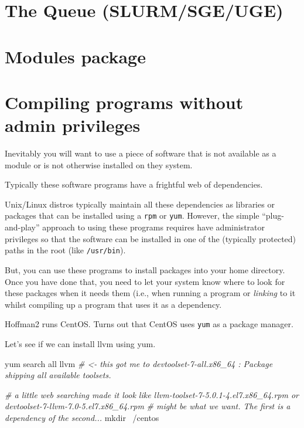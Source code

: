 \documentclass[]{krantz}
\makeatletter
\newenvironment{Shaded}{\begin{snugshade}}{\end{snugshade}}
\newcommand{\CommentTok}[1]{\textcolor[rgb]{0.37,0.37,0.37}{\textit{#1}}}
\newcommand{\ExtensionTok}[1]{#1}
\newcommand{\FunctionTok}[1]{\textcolor[rgb]{0,0,0}{#1}}
\newcommand{\NormalTok}[1]{#1}
\newenvironment{kframe}{%
\medskip{}
\setlength{\fboxsep}{.8em}
 \def\at@end@of@kframe{}%
 \ifinner\ifhmode%
  \def\at@end@of@kframe{\end{minipage}}%
  \begin{minipage}{\columnwidth}%
 \fi\fi%
 \def\FrameCommand##1{\hskip\@totalleftmargin \hskip-\fboxsep
 \colorbox{shadecolor}{##1}\hskip-\fboxsep
     \hskip-\linewidth \hskip-\@totalleftmargin \hskip\columnwidth}%
 \MakeFramed {\advance\hsize-\width
   \@totalleftmargin\z@ \linewidth\hsize
   \@setminipage}}%
 {\par\unskip\endMakeFramed%
 \at@end@of@kframe}
\renewenvironment{Shaded}{\begin{kframe}}{\end{kframe}}
\makeatother
\begin{document}
\hypertarget{the-queue-slurmsgeuge}{%
\section{The Queue (SLURM/SGE/UGE)}\label{the-queue-slurmsgeuge}}

\hypertarget{modules-package}{%
\section{Modules package}\label{modules-package}}

\hypertarget{compiling-programs-without-admin-privileges}{%
\section{Compiling programs without admin privileges}\label{compiling-programs-without-admin-privileges}}

Inevitably you will want to use a piece of software that is not available as
a module or is not otherwise installed on they system.

Typically these software programs have a frightful web of dependencies.

Unix/Linux distros typically maintain all these dependencies as libraries or packages
that can be installed using a \texttt{rpm} or \texttt{yum}. However, the simple ``plug-and-play'' approach
to using these programs requires have administrator privileges so that the software can
be installed in one of the (typically protected) paths in the root (like \texttt{/usr/bin}).

But, you can use these programs to install packages into your home directory. Once you have done
that, you need to let your system know where to look for these packages when it needs them
(i.e., when running a program or \emph{linking} to it whilst compiling up a program that uses it
as a dependency.

Hoffman2 runs CentOS. Turns out that CentOS uses \texttt{yum} as a package manager.

Let's see if we can install llvm using yum.

\begin{Shaded}
\begin{Highlighting}[]
\ExtensionTok{yum}\NormalTok{ search all llvm }\CommentTok{# <- this got me to devtoolset-7-all.x86_64 : Package shipping all available toolsets.}

\CommentTok{# a little web searching made it look like llvm-toolset-7-5.0.1-4.el7.x86_64.rpm or devtoolset-7-llvm-7.0-5.el7.x86_64.rpm}
\CommentTok{# might be what we want.  The first is a dependency of the second...}
\FunctionTok{mkdir}\NormalTok{ ~/centos}
\end{Highlighting}
\end{Shaded}
\end{document}
